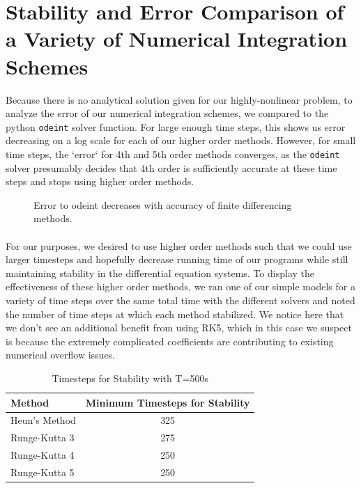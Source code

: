 \documentclass[12pt]{article}
\begin{document}
\section{Stability and Error Comparison of a Variety of Numerical Integration Schemes}
Because there is no analytical solution given for our highly-nonlinear problem, to analyze the error of our numerical integration schemes, we compared to the python \texttt{odeint} solver function. For large enough time steps, this shows us error decreasing on a log scale for each of our higher order methods. However, for small time steps, the `error` for 4th and 5th order methods converges, as the \texttt{odeint} solver presumably decides that 4th order is sufficiently accurate at these time steps and stops using higher order methods.\\
\begin{figure}
  \centering
  \caption{Error to odeint decreases with accuracy of finite differencing methods.}
\end{figure}
\paragraph{}For our purposes, we desired to use higher order methods such that we could use larger timesteps and hopefully decrease running time of our programs while still maintaining stability in the differential equation systems. To display the effectiveness of these higher order methods, we ran one of our simple models for a variety of time steps over the same total time with the different solvers and noted the number of time steps at which each method stabilized. We notice here that we don't see an additional benefit from using RK5, which in this case we suspect is because the extremely complicated coefficients are contributing to existing numerical overflow issues.\\
\begin{table}[H]
\centering
\caption{Timesteps for Stability with T=500s}
\label{my-label}
\begin{tabular}{lc}
 Method &  Minimum Timesteps for Stability\\ \hline
 Heun's Method & 325 \\
 Runge-Kutta 3 &  275\\
 Runge-Kutta 4 &  250\\
 Runge-Kutta 5 & 250
\end{tabular}
\end{table}
\end{document}
